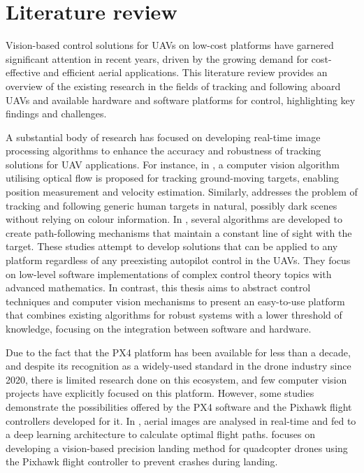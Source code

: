 \section{Literature review}
\label{sec:lit-review}



Vision-based control solutions for UAVs on low-cost platforms have garnered significant attention in recent years, driven by the growing demand for cost-effective and efficient aerial applications. This literature review provides an overview of the existing research in the fields of tracking and following aboard UAVs and available hardware and software platforms for control, highlighting key findings and challenges.

A substantial body of research has focused on developing real-time image processing algorithms to enhance the accuracy and robustness of tracking solutions for UAV applications. For instance, in \cite{gomez-balderas2012}, a computer vision algorithm utilising optical flow is proposed for tracking ground-moving targets, enabling position measurement and velocity estimation. Similarly, \cite{bevilacqua2016} addresses the problem of tracking and following generic human targets in natural, possibly dark scenes without relying on colour information. In \cite{rysdyk2003}, several algorithms are developed to create path-following mechanisms that maintain a constant line of sight with the target. These studies attempt to develop solutions that can be applied to any platform regardless of any preexisting autopilot control in the UAVs.
They focus on low-level software implementations of complex control theory topics with advanced mathematics.
In contrast, this thesis aims to abstract control techniques and computer vision mechanisms to present an easy-to-use platform that combines existing algorithms for robust systems with a lower threshold of knowledge, focusing on the integration between software and hardware.

Due to the fact that the PX4 platform has been available for less than a decade, and despite its recognition as a widely-used standard in the drone industry since 2020, there is limited research done on this ecosystem, and few computer vision projects have explicitly focused on this platform. However, some studies demonstrate the possibilities offered by the PX4 software and the Pixhawk flight controllers developed for it. In \cite{sizkouhi2022}, aerial images are analysed in real-time and fed to a deep learning architecture to calculate optimal flight paths. \cite{naufal2022} focuses on developing a vision-based precision landing method for quadcopter drones using the Pixhawk flight controller to prevent crashes during landing.

